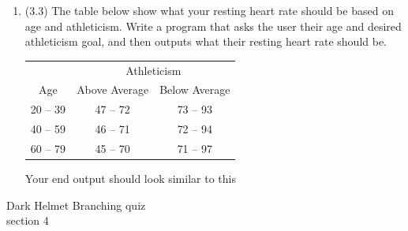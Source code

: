 \documentclass{article}
\begin{document}
\begin{enumerate}
\item (3.3)  
		The table below show what your resting heart rate should be based on age and athleticism.  
		Write a program that asks the user their age and desired athleticism goal, and then outputs 
		what their resting heart rate should be.

		\begin{minipage}{.45\textwidth}
			\begin{tabular}{c|cc}
				& \multicolumn{2}{c}{Athleticism}\\
				Age & Above Average & Below Average \\ \hline
				20 -- 39 & 47 -- 72 & 73 -- 93\\
				40 -- 59 & 46 -- 71 & 72 -- 94\\
				60 -- 79 & 45 -- 70 & 71 -- 97 \\
			\end{tabular}
		\end{minipage}
		\begin{minipage}{.45\textwidth}
			\vspace*{1em}
			Your end output should look similar to this
		\end{minipage}





\end{enumerate}
\pagebreak
Dark Helmet \hfill Branching quiz\\
section 4\\
\end{document}
